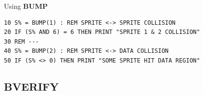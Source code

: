 \begin{description}[leftmargin=2cm,style=nextline]
\item [Example:]  Using {\bf BUMP}

\begin{tcolorbox}[colback=black,coltext=white]
\verbatimfont{\codefont}
\begin{verbatim}
10 S% = BUMP(1) : REM SPRITE <-> SPRITE COLLISION
20 IF (S% AND 6) = 6 THEN PRINT "SPRITE 1 & 2 COLLISION"
30 REM ---
40 S% = BUMP(2) : REM SPRITE <-> DATA COLLISION
50 IF (S% <> 0) THEN PRINT "SOME SPRITE HIT DATA REGION"
\end{verbatim}
\end{tcolorbox}
\end{description}


\newpage
\subsection{BVERIFY}
